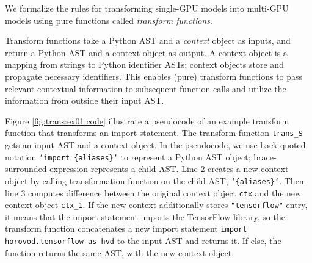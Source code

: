 \noindent
We formalize the rules for transforming single-GPU models into multi-GPU
models using pure functions called {\it transform functions}. 
\begin{inred}
Transform functions take a Python AST and a {\it context} object as inputs,
and return a Python AST and a context object as output.
A context object is a mapping from strings to Python identifier ASTs;
context objects store and propagate necessary identifiers.
This enables (pure) transform functions to pass relevant contextual information
to subsequent function calls and utilize the information from outside their
input AST.

Figure \ref{fig:trans:ex01:code} illustrate a pseudocode of an example 
transform function that transforms an import statement.
The transform function {\tt trans\_S} gets an input AST and a context object.
In the pseudocode, we use back-quoted notation {\tt `import \{aliases\}`} 
to represent a Python AST object;
brace-surrounded expression represents a child AST.
Line 2 creates a new context object by calling transformation function
on the child AST, {\tt `\{aliases\}`}.
Then line 3 computes difference between the original context object {\tt ctx}
and the new context object {\tt ctx\_1}.
If the new context additionally stores {\tt "tensorflow"} entry,
it means that the import statement imports the TensorFlow library,
so the transform function concatenates a new import statement
{\tt import horovod.tensorflow as hvd} to the input AST and returns it.
If else, the function returns the same AST, with the new context object.
\end{inred}


